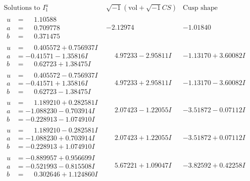 \documentclass[1p]{elsarticle_modified}
\theoremstyle{definition}
\newcommand{\I}{\sqrt{-1}}
\begin{document}
$$\begin{array}{c|c|c}  
\text{Solutions to }I^u_{1}& \I (\text{vol} + \sqrt{-1}CS) & \text{Cusp shape}\\
 \hline 
\begin{aligned}
u &= \phantom{-}1.10588\phantom{ +0.000000I} \\
a &= \phantom{-}0.709778\phantom{ +0.000000I} \\
b &= \phantom{-}0.371475\phantom{ +0.000000I}\end{aligned}
 & -2.12974\phantom{ +0.000000I} & -1.01840\phantom{ +0.000000I} \\ \hline\begin{aligned}
u &= \phantom{-}0.405572 + 0.756937 I \\
a &= -0.41571 - 1.35816 I \\
b &= \phantom{-}0.62723 + 1.38475 I\end{aligned}
 & \phantom{-}4.97233 - 2.95811 I & -1.13170 + 3.60082 I \\ \hline\begin{aligned}
u &= \phantom{-}0.405572 - 0.756937 I \\
a &= -0.41571 + 1.35816 I \\
b &= \phantom{-}0.62723 - 1.38475 I\end{aligned}
 & \phantom{-}4.97233 + 2.95811 I & -1.13170 - 3.60082 I \\ \hline\begin{aligned}
u &= \phantom{-}1.189210 + 0.282581 I \\
a &= -1.088230 - 0.703914 I \\
b &= -0.228913 - 1.074910 I\end{aligned}
 & \phantom{-}2.07423 - 1.22055 I & -3.51872 - 0.07112 I \\ \hline\begin{aligned}
u &= \phantom{-}1.189210 - 0.282581 I \\
a &= -1.088230 + 0.703914 I \\
b &= -0.228913 + 1.074910 I\end{aligned}
 & \phantom{-}2.07423 + 1.22055 I & -3.51872 + 0.07112 I \\ \hline\begin{aligned}
u &= -0.889957 + 0.956699 I \\
a &= -0.521993 - 0.815508 I \\
b &= \phantom{-}0.302646 + 1.124860 I\end{aligned}
 & \phantom{-}5.67221 + 1.09047 I & -3.82592 + 0.42258 I \\ \hline\begin{aligned}

\end{aligned}
\end{array}$$
\end{document}

